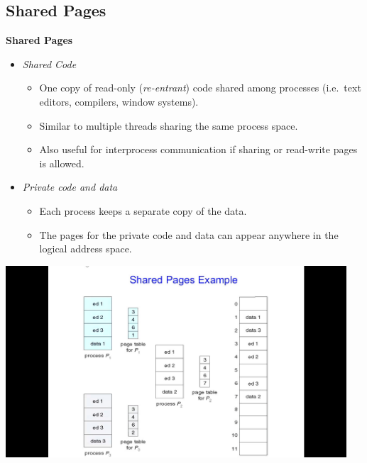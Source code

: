 \documentclass[11pt,a4paper]{article}
\begin{document}
\subsection{Shared Pages}

\textbf{Shared Pages}
\begin{itemize}
    \item \emph{Shared Code}
        \begin{itemize}
            \item One copy of read-only (\emph{re-entrant}) code shared among processes
                (i.e.\ text editors, compilers, window systems).
            \item Similar to multiple threads sharing the same process space.
            \item Also useful for interprocess communication if sharing or read-write
                pages is allowed.
        \end{itemize}
    \item \emph{Private code and data}
        \begin{itemize}
            \item Each process keeps a separate copy of the data.
            \item The pages for the private code and data can appear anywhere in the logical
                address space.
        \end{itemize}
\end{itemize}

\includegraphics[height=270]{shared-pages-example.jpg}
\end{document}

